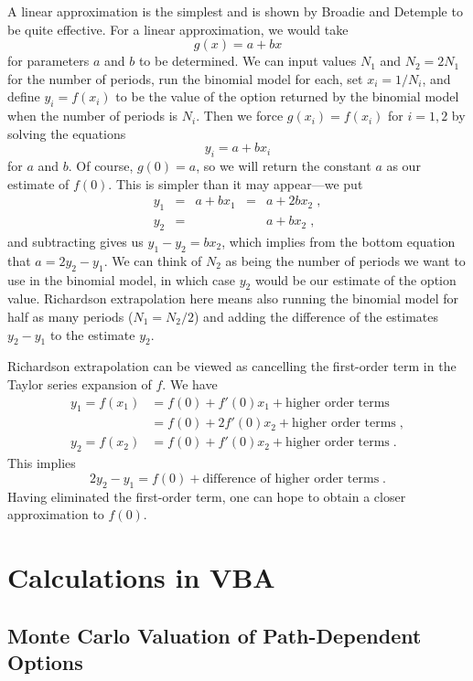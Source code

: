 A linear approximation is the simplest and is shown by Broadie and Detemple to be quite effective.  For a linear approximation, we would take 
$$g(x) = a + bx$$
for parameters $a$ and $b$ to be determined.
We can input values $N_1$ and $N_2 = 2N_1$ for the number of periods, run the binomial model for each, set $x_i=1/N_i$, and define $y_i=f(x_i)$ to be the value of the option returned by the binomial model when the number of periods is $N_i$.  Then we force $g(x_i)=f(x_i)$ for $i=1,2$ by solving the equations
$$y_i=a + bx_i$$
for $a$ and $b$.
Of course, $g(0) = a$, so we will return the constant $a$ as our estimate of $f(0)$.  This is simpler than it may appear---we put
\begin{equation*}\begin{array}{rclcl}
y_1 &= &a + bx_1 &= &a+2bx_2\;,\\
y_2 &= & &  & a + bx_2 \;,
\end{array}\end{equation*}
and subtracting gives us $y_1-y_2 = bx_2$, which implies from the bottom equation that $a = 2y_2-y_1$.  We can think of $N_2$ as being the number of periods we want to use in the binomial model, in which case $y_2$ would be our estimate of the option value.  Richardson extrapolation here means also running the binomial model for half as many periods ($N_1 = N_2/2$) and adding the difference of the estimates $y_2-y_1$ to the estimate $y_2$.  

Richardson extrapolation can be viewed as cancelling the first-order term in the Taylor series expansion of $f$.  We have
\begin{align*}
y_1 = f(x_1) &= f(0) + f'(0)x_1 + \text{higher order terms} \\
& = f(0) + 2f'(0)x_2 + \text{higher order terms}\;,\\
y_2 = f(x_2) &= f(0) + f'(0)x_2 + \text{higher order terms}\;.
\end{align*}
\newpage\noindent
This implies
$$2y_2-y_1 = f(0) + \text{difference of higher order terms}\;.$$
Having eliminated the first-order term, one can hope to obtain a closer approximation to $f(0)$.


\section{Calculations in VBA}\label{s_montecarlo_matlab}

\subsection*{Monte Carlo Valuation of Path-Dependent Options}

